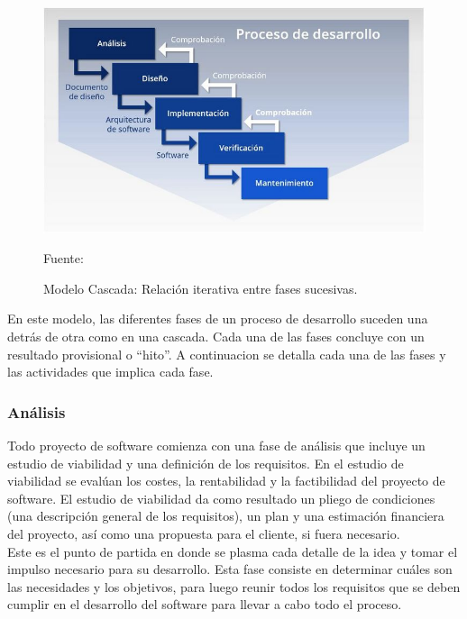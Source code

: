 \begin{figure}[H]
    \begin{center}
        \includegraphics[width=12cm]{img/capitulo_2/waterfall.jpeg}
    \end{center}
    \begin{center}
        \caption{Modelo Cascada: Relación iterativa entre fases sucesivas.}
        Fuente: \cite{blog:modelocascada}
        \label{fig:cascada_iterativa}    
    \end{center}
\end{figure}

En este modelo, las diferentes fases de un proceso de desarrollo suceden una detrás de otra como en una cascada. Cada una de las fases concluye con un resultado provisional o ``hito''. A continuacion se detalla cada una de las fases y las actividades que implica cada fase.\\

\subsubsection{Análisis}

Todo proyecto de software comienza con una fase de análisis que incluye un estudio de viabilidad y una definición de los requisitos. En el estudio de viabilidad se evalúan los costes, la rentabilidad y la factibilidad del proyecto de software. El estudio de viabilidad da como resultado un pliego de condiciones (una descripción general de los requisitos), un plan y una estimación financiera del proyecto, así como una propuesta para el cliente, si fuera necesario.\\

Este es el punto de partida en donde se plasma cada detalle de la idea y tomar el impulso necesario para su desarrollo. Esta fase consiste en determinar cuáles son las necesidades y los objetivos, para luego reunir todos los requisitos que se deben cumplir en el desarrollo del software para llevar a cabo todo el proceso.\\

